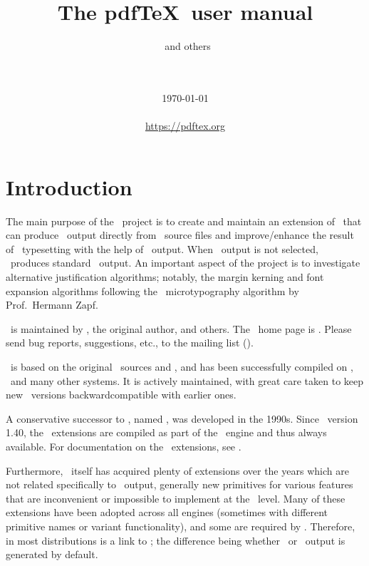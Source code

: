 \documentclass{pdftexmanual}
\title{The pdf\TeX\ user manual}
\author{\THANH\ and others}
\date{\PDFTEX\ \currentpdftex\\
      \hspace*{1em}\\ \today\\
      \hspace*{1em}\\ \url{https://pdftex.org}
     }
\begin{document}
\hypersetup{pageanchor=false} %
\maketitle
\hypersetup{pageanchor=true}  %
\setcounter{page}{2}

\tableofcontents

\chapter{Introduction}

The main purpose of the \PDFTEX\ project is to create and maintain an
extension of \TEX\ that can produce \PDF\ output directly from \TEX\
source files and improve\slash enhance the result of \TEX\ typesetting
with the help of \PDF\ output. When \PDF\ output is not selected,
\PDFTEX\ produces standard \DVI\ output. An important aspect of the
project is to investigate alternative justification algorithms; notably,
the margin kerning and font expansion algorithms following the \HZ\
micro\hyph typography algorithm by Prof.~Hermann Zapf.

\PDFTEX\ is maintained by \THANH, the original author, and others. The
\PDFTEX\ home page is . Please send bug reports,
suggestions, etc., to the mailing list (\useurl{ptexbugs}).

\PDFTEX\ is based on the original \TEX\ sources and \WEBC, and has been
successfully compiled on \UNIX, \WIN\ and many other systems. It is
actively maintained, with great care taken to keep new \PDFTEX\ versions
backward\hyph compatible with earlier ones.

A conservative successor to \TEX, named \ETEX, was developed in the
1990s. Since \PDFTEX\ version 1.40, the \ETEX\ extensions are compiled
as part of the \PDFTEX\ engine and thus always available. For
documentation on the \ETEX\ extensions, see \useurl{etexctan}.

Furthermore, \PDFTEX\ itself has acquired plenty of extensions over the
years which are not related specifically to \PDF\ output, generally new
primitives for various features that are inconvenient or impossible to
implement at the \TEX\ level. Many of these extensions have been adopted
across all engines (sometimes with different primitive names or variant
functionality), and some are required by \LATEX. Therefore, in most
distributions \type{etex} is a link to \type{pdftex}; the difference
being whether \DVI\ or \PDF\ output is generated by default.
\end{document}
